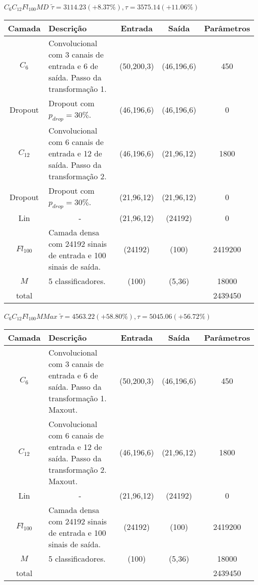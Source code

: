 \begin{tiny}
\begin{table}[H]
	$C_6C_{12}Fl_{100}MD$ $\tilde{\tau}=3114.23 (+8.37\%), \tau=3575.14 (+11.06\%)$\newline
	\begin{tabularx}{\linewidth}{ |c|X|c|c|c| }
		\hline
		Camada & Descrição & Entrada & Saída & Parâmetros \\ \hline
		$C_{6}$ & Convolucional com 3 canais de entrada e 6 de saída. Passo da transformação 1. & (50,200,3) & (46,196,6) & 450 \\ \hline
		Dropout & Dropout com $p_{drop} = 30\%$. & (46,196,6) & (46,196,6) & 0 \\ \hline
		$C_{12}$ & Convolucional com 6 canais de entrada e 12 de saída. Passo da transformação 2. & (46,196,6) & (21,96,12) & 1800 \\ \hline
		Dropout & Dropout com $p_{drop} = 30\%$. & (21,96,12) & (21,96,12) & 0 \\ \hline
		Lin & \multicolumn{1}{c|}{-} & (21,96,12) & (24192) & 0 \\ \hline
		$Fl_{100}$ & Camada densa com 24192 sinais de entrada e 100 sinais de saída. & (24192) & (100) & 2419200 \\ \hline
		$M$ & 5 classificadores. & (100) & (5,36) & 18000 \\ \hline
		total &  &  &  & 2439450 \\ \hline
	\end{tabularx}
\end{table}

\begin{table}[H]
	$C_6C_{12}Fl_{100}MMax$ $\tilde{\tau}=4563.22 (+58.80\%), \tau=5045.06 (+56.72\%)$\newline
	\begin{tabularx}{\linewidth}{ |c|X|c|c|c| }
		\hline
		Camada & Descrição & Entrada & Saída & Parâmetros \\ \hline
		$C_{6}$ & Convolucional com 3 canais de entrada e 6 de saída. Passo da transformação 1. Maxout. & (50,200,3) & (46,196,6) & 450 \\ \hline
		$C_{12}$ & Convolucional com 6 canais de entrada e 12 de saída. Passo da transformação 2. Maxout. & (46,196,6) & (21,96,12) & 1800 \\ \hline
		Lin & \multicolumn{1}{c|}{-} & (21,96,12) & (24192) & 0 \\ \hline
		$Fl_{100}$ & Camada densa com 24192 sinais de entrada e 100 sinais de saída. & (24192) & (100) & 2419200 \\ \hline
		$M$ & 5 classificadores. & (100) & (5,36) & 18000 \\ \hline
		total &  &  &  & 2439450 \\ \hline
	\end{tabularx}
\end{table}


\end{tiny}
